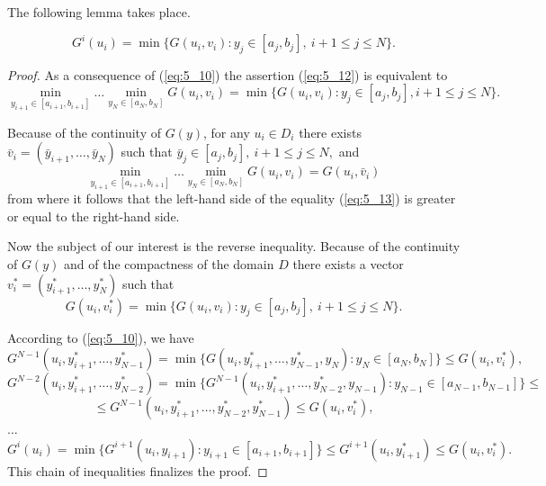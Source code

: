 The following lemma takes place.
\begin{lemma} 
\label{lem:5_1}
\begin{equation}
\label{eq:5_12}
G^i(u_i)=\min\{G(u_i,v_i):y_j\in [a_j,b_j],\:i+1\leq j\leq N\}.
\end{equation}
\end{lemma}
\begin{proof}
As a consequence of (\ref{eq:5_10}) the assertion (\ref{eq:5_12}) is equivalent to
\begin{equation}
\label{eq:5_13}
\min_{y_{i+1}\in [a_{i+1},b_{i+1}]}\ldots \min_{y_N\in [a_N,b_N]}G(u_i,v_i)=\min\{G(u_i,v_i):y_j\in [a_j,b_j],i+1\leq j\leq N\}.
\end{equation}

Because of the continuity of $G(y)$, for any $u_i\in D_i$ there exists $\bar{v}_i=(\bar{y}_{i+1},\ldots,\bar{y}_N)$ such that $\bar{y}_j\in [a_j,b_j],\:i+1\leq j\leq N,$ and
\begin{displaymath}
\min_{y_{i+1}\in [a_{i+1},b_{i+1}]}\ldots \min_{y_N\in [a_N,b_N]}G(u_i,v_i)=G(u_i,\bar{v}_i)
\end{displaymath}
from where it follows that the left-hand side of the equality  (\ref{eq:5_13}) is greater or equal to the right-hand side. 

Now the subject of our interest is the reverse inequality. Because of the continuity of $G(y)$ and of the compactness of the domain $D$  there exists a vector $v_i^*=(y_{i+1}^*,\ldots ,y_N^*)$  such that 
\begin{displaymath}
G(u_i,v_i^*)=\min\{G(u_i,v_i):y_j\in [a_j,b_j],\:i+1\leq j\leq N\}.
\end{displaymath}

According to (\ref{eq:5_10}), we have
\begin{displaymath}
G^{N-1}(u_i,y_{i+1}^*,\ldots ,y_{N-1}^*)=\min\{G(u_i,y_{i+1}^*,\ldots,y_{N-1}^*,y_N):y_N\in [a_N,b_N]\}\leq G(u_i,v_i^*),
\end{displaymath}
\begin{displaymath}
G^{N-2}(u_i,y_{i+1}^*,\ldots ,y_{N-2}^*)=\min\{G^{N-1}(u_i,y_{i+1}^*,\ldots,y_{N-2}^*,y_{N-1}):y_{N-1}\in [a_{N-1},b_{N-1}]\}\leq 
\end{displaymath}
\begin{displaymath}
\leq G^{N-1}(u_i,y_{i+1}^*,\ldots,y_{N-2}^*,y_{N-1}^*)\leq G(u_i,v_i^*),
\end{displaymath}
$\ldots$
\begin{displaymath}
G^i(u_i)=\min\{G^{i+1}(u_i,y_{i+1}):y_{i+1}\in [a_{i+1},b_{i+1}]\}\leq G^{i+1}(u_i,y_{i+1}^*)\leq G(u_i,v_i^*).
\end{displaymath}
This chain of inequalities finalizes the proof.
\end{proof}


